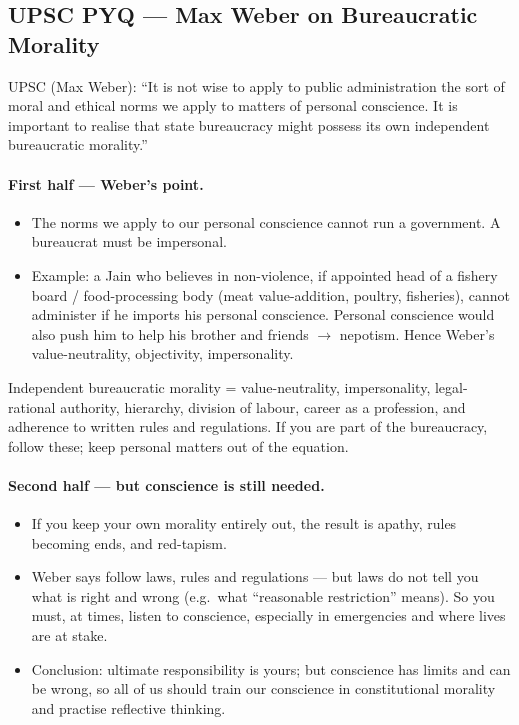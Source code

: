 \subsection{UPSC PYQ --- Max Weber on Bureaucratic Morality}
\begin{PYQLink}
UPSC (Max Weber): ``It is not wise to apply to public administration the sort of moral and ethical norms we apply to matters of personal conscience. It is important to realise that state bureaucracy might possess its own independent bureaucratic morality.''
\end{PYQLink}

\paragraph{First half --- Weber's point.}
\begin{itemize}
\item The norms we apply to our personal conscience cannot run a government. A bureaucrat must be impersonal.
\item Example: a Jain who believes in non-violence, if appointed head of a fishery board / food-processing body (meat value-addition, poultry, fisheries), cannot administer if he imports his personal conscience. Personal conscience would also push him to help his brother and friends $\rightarrow$ nepotism. Hence Weber's value-neutrality, objectivity, impersonality.
\end{itemize}

\begin{KeyConcept}
Independent bureaucratic morality = value-neutrality, impersonality, legal-rational authority, hierarchy, division of labour, career as a profession, and adherence to written rules and regulations. If you are part of the bureaucracy, follow these; keep personal matters out of the equation.
\end{KeyConcept}

\paragraph{Second half --- but conscience is still needed.}
\begin{CriticalPoint}
\begin{itemize}
\item If you keep your own morality entirely out, the result is apathy, rules becoming ends, and red-tapism.
\item Weber says follow laws, rules and regulations --- but laws do not tell you what is right and wrong (e.g.\ what ``reasonable restriction'' means). So you must, at times, listen to conscience, especially in emergencies and where lives are at stake.
\item Conclusion: ultimate responsibility is yours; but conscience has limits and can be wrong, so all of us should train our conscience in constitutional morality and practise reflective thinking.
\end{itemize}
\end{CriticalPoint}

